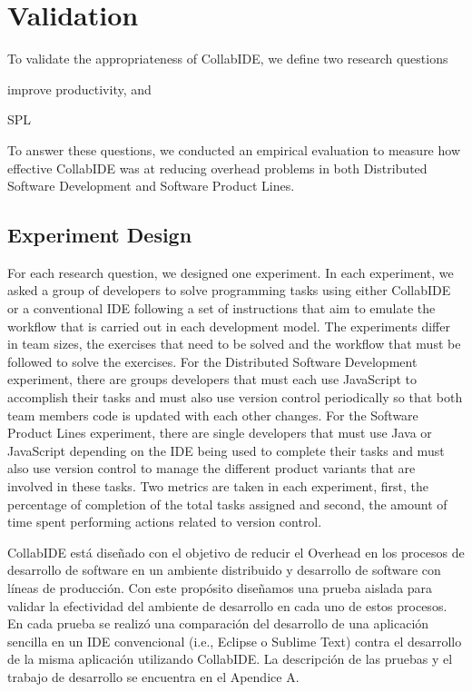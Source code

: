 

\section{Validation}
\label{sec:validation}

To validate the appropriateness of CollabIDE, we define two research questions
\begin{enumerate*}[label=(\arabic*)]
\item improve productivity, and
\item SPL
\end{enumerate*} 
To answer these questions, we conducted an empirical evaluation 
to measure how effective CollabIDE was at reducing overhead problems 
in both Distributed Software Development and Software Product Lines.

\subsection{Experiment Design}

For each research question, we designed one experiment. In each experiment, we asked 
a group of developers to solve programming tasks using either CollabIDE or a 
conventional IDE following a set of instructions that aim to emulate the workflow that is carried out in each development model. The experiments differ in team sizes, the exercises that need to be solved and the workflow that must be followed to solve the exercises. For the Distributed Software Development experiment, there are groups developers that must each use JavaScript to accomplish their tasks and must also use version control periodically so that both team members code is updated with each other changes. For the Software Product Lines experiment, there are single developers that must use Java or JavaScript depending on the IDE being used to complete their tasks and must also use version control to manage the different product variants that are involved in these tasks. Two metrics are taken in each experiment, first, the percentage of completion of the total tasks assigned and second, the amount of time spent performing actions related to version control.

CollabIDE está diseñado con el objetivo de reducir el Overhead en los procesos de desarrollo de software en un ambiente distribuido y desarrollo de software con líneas de producción. Con este propósito diseñamos una prueba aislada para validar la efectividad del ambiente de desarrollo en cada uno de estos procesos. En cada prueba se realizó una comparación del desarrollo de una aplicación sencilla en un IDE convencional (i.e., Eclipse o Sublime Text) contra el desarrollo de la misma aplicación utilizando CollabIDE. La descripción de las pruebas y el trabajo de desarrollo se encuentra en el Apendice A.

